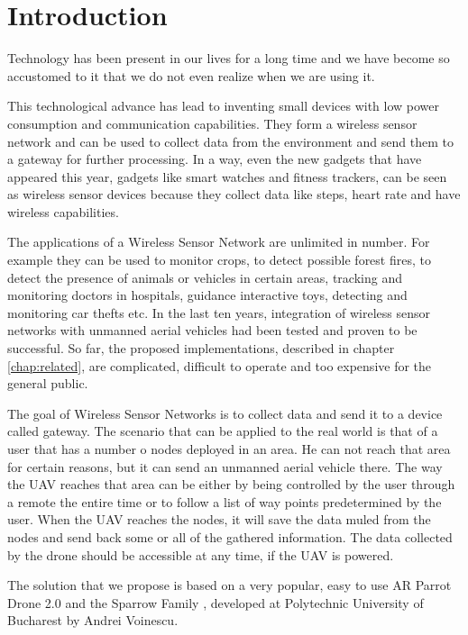 \normalfont\normalsize
\chapter{Introduction}

Technology has been present in our lives for a long time and we have become so accustomed to it that we do not even realize when we are using it.

This technological advance has lead to inventing small devices with low power consumption and communication capabilities. They form a wireless sensor network and can be used to collect data from the environment and send them to a gateway for further processing. In a way, even the new gadgets that have appeared this year, gadgets like smart watches and fitness trackers, can be seen as wireless sensor devices because they collect data like steps, heart rate and have wireless capabilities.

The applications of a Wireless Sensor Network are unlimited in number. For example they can be used to monitor crops, to detect possible forest fires, to detect the presence of animals or vehicles in certain areas, tracking and monitoring doctors in hospitals, guidance interactive toys, detecting and monitoring car thefts etc. In the last ten years, integration of wireless sensor networks with unmanned aerial vehicles had been tested and proven to be successful. So far, the proposed implementations, described in chapter \ref{chap:related}, are complicated, difficult to operate and too expensive for the general public.

The goal of Wireless Sensor Networks is to collect data and send it to a device called gateway. The scenario that can be applied to the real world is that of a user that  has a number o nodes deployed in an area. He can not reach that area for certain reasons, but it can send an unmanned aerial vehicle there. The way the UAV reaches that area can be either by being controlled by the user through a remote the entire time or to follow a list of way points predetermined by the user. When the UAV reaches the nodes, it will save the data muled from the nodes and send back some or all of the gathered information. The data collected by the drone should be accessible at any time, if the UAV is powered.

 
The solution that we propose is based on a very popular, easy to use AR Parrot Drone 2.0 and the Sparrow Family \cite{voinescu2013lightweight}, developed at Polytechnic University of Bucharest by Andrei Voinescu.
